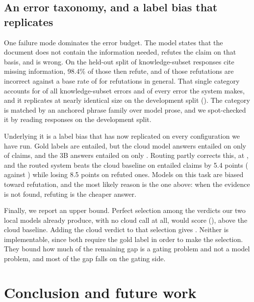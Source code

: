 \documentclass{article}
\begin{document}
\subsection{An error taxonomy, and a label bias that replicates}
\label{sec:taxonomy}

One failure mode dominates the error budget. The model states that the document does not
contain the information needed, refutes the claim on that basis, and is wrong. On the
held-out split \missingInfoCiteRateTest{} of knowledge-subset responses cite missing
information, 98.4\% of those then refute, and \missingInfoWrongTest{} of those refutations
are incorrect against a base rate of \missingInfoBaseTest{} for refutations in general.
That single category accounts for \missingInfoKnowTest{} of all knowledge-subset errors and
\missingInfoAllTest{} of every error the system makes, and it replicates at nearly identical
size on the development split (\missingInfoKnowDev{}). The category is matched by an
anchored phrase family over model prose, and we spot-checked it by reading responses on the
development split.

Underlying it is a label bias that has now replicated on every configuration we have run.
Gold labels are \saysEntailedGold{} entailed, but the cloud model answers entailed on only
\saysEntailedCloud{} of claims, and the 3B answers entailed on only \saysEntailedThreeB{}.
Routing partly corrects this, at \saysEntailedRouted{}, and the routed system beats the
cloud baseline on entailed claims by 5.4 points (\entailedRouted{} against
\entailedCloud{}) while losing 8.5 points on refuted ones. Models on this task are biased
toward refutation, and the most likely reason is the one above: when the evidence is not
found, refuting is the cheaper answer.

Finally, we report an upper bound. Perfect selection among the verdicts our two local
models already produce, with no cloud call at all, would score \oracleLocalOnly{}
(\oracleLocalOnlyci{}), above the cloud baseline. Adding the cloud verdict to that
selection gives \oracleThreeWay{}. Neither is implementable, since both require the gold
label in order to make the selection. They bound how much of the remaining gap is a gating
problem and not a model problem, and most of the gap falls on the gating side.

\section{Conclusion and future work}
\label{sec:conclusion}
\end{document}
